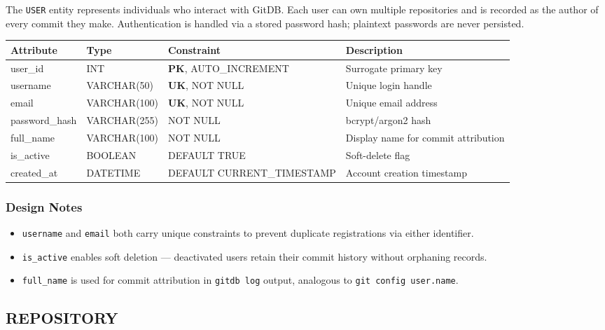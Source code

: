 \documentclass[12pt, a4paper]{article}
\newcommand{\pk}{\textbf{\textcolor{sectioncolor}{PK}}}
\newcommand{\uk}{\textbf{\textcolor{green!50!black}{UK}}}
\begin{document}
The \texttt{USER} entity represents individuals who interact with GitDB. Each
user can own multiple repositories and is recorded as the author of every commit
they make. Authentication is handled via a stored password hash; plaintext
passwords are never persisted.

\begin{center}
\begin{tabular}{>{\ttfamily}l >{\ttfamily}l l l}
\toprule
\textbf{Attribute} & \textbf{Type} & \textbf{Constraint} & \textbf{Description} \\
\midrule
user\_id       & INT           & \pk, AUTO\_INCREMENT  & Surrogate primary key \\
username       & VARCHAR(50)   & \uk, NOT NULL         & Unique login handle \\
email          & VARCHAR(100)  & \uk, NOT NULL         & Unique email address \\
password\_hash & VARCHAR(255)  & NOT NULL              & bcrypt/argon2 hash \\
full\_name     & VARCHAR(100)  & NOT NULL              & Display name for commit attribution \\
is\_active     & BOOLEAN       & DEFAULT TRUE          & Soft-delete flag \\
created\_at    & DATETIME      & DEFAULT CURRENT\_TIMESTAMP & Account creation timestamp \\
\bottomrule
\end{tabular}
\end{center}

\subsubsection*{Design Notes}
\begin{itemize}[leftmargin=1.5em]
    \item \texttt{username} and \texttt{email} both carry unique constraints to
    prevent duplicate registrations via either identifier.
    \item \texttt{is\_active} enables soft deletion --- deactivated users retain
    their commit history without orphaning records.
    \item \texttt{full\_name} is used for commit attribution in \texttt{gitdb log}
    output, analogous to \texttt{git config user.name}.
\end{itemize}

\subsection{REPOSITORY}
\end{document}
